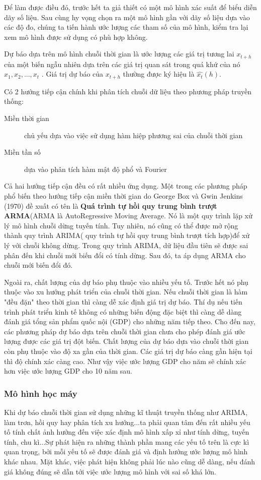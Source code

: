 Để làm được điều đó, trước hết ta giả thiết có một mô hình xác suất để biểu diễn dãy số liệu. Sau cùng hy vọng chọn ra một mô hình gần với dãy số liệu dựa vào các độ đo, chúng ta tiến hành ước lượng các tham số của mô hình, kiểm tra lại xem mô hình được sử dụng có phù hợp không.

Dự báo dựa trên mô hình chuỗi thời gian là ước lượng các giá trị tương lai $x_{t+h}$ của một biến ngẫu nhiên dựa trên các giá trị quan sát trong quá khứ của nó $x_1,x_2,...,x_t$ . Giá trị dự báo của $x_{t+h}$ thường được ký hiệu là $\hat{x_t}(h)$.


Có 2 hướng tiếp cận chính \citep{cits} khi phân tích chuỗi dữ liệu theo phương pháp truyền thống:
\begin{description}
  \item[Miền thời gian] chủ yếu dựa vào việc sử dụng hàm hiệp phương sai của chuỗi thời gian
  \item[Miền tần số] dựa vào phân tích hàm mật độ phổ và Fourier
\end{description}
Cả hai hướng tiếp cận đều có rất nhiều ứng dụng. Một trong các phương pháp phổ biến theo hướng tiếp cận miền thời gian do George Box và Gwin Jenkins (1970)\citep{ross} đề xuất có tên là \textbf{Quá trình tự hồi quy trung bình trượt ARMA}(ARMA là AutoRegressive Moving Average. Nó là một quy trình lặp xử lý mô hình chuỗi dừng tuyến tính. Tuy nhiên, nó cũng có thể được mở rộng thành quy trình ARIMA( quy trình tự hồi quy trung bình trượt tích hợp)để xử lý với chuỗi không dừng. Trong quy trình ARIMA, dữ liệu đầu tiên sẽ được sai phân đến khi chuỗi mới biến đổi có tính dừng. Sau đó, ta áp dụng ARMA cho chuỗi mới biến đổi đó.

Ngoài ra, chất lượng của dự báo phụ thuộc vào nhiều yếu tố. Trước hết nó phụ thuộc vào xu hướng phát triển của chuỗi thời gian. Nếu chuỗi thời gian là hàm "đều đặn" theo thời gian thì càng dễ xác định giá trị dự báo. Thí dụ nếu tiến trình phát triển kinh tế không có những biến động đặc biệt thì càng dễ dàng đánh giá tổng sản phẩm quốc nội (GDP) cho những năm tiếp theo. Cho đến nay, các phương pháp dự báo dựa trên chuỗi thời gian chưa cho phép đánh giá ước lượng được các giá trị đột biến. Chất lượng của dự báo dựa vào chuỗi thời gian còn phụ thuộc vào độ xa gần của thời gian. Các giá trị dự báo càng gần hiện tại thì độ chính xác càng cao. Như vậy việc ước lượng GDP cho năm sẽ chính xác hơn việc ước lượng GDP cho 10 năm sau.
\subsubsection{Mô hình học máy}
Khi dự báo chuỗi thời gian sử dụng những kĩ thuật truyền thống như ARIMA, làm trơn, hồi quy hay phân tích xu hướng...ta phải quan tâm đến rất nhiều yếu tố tính chất ảnh hưởng đến việc xác định mô hình xấp xỉ như tính dừng, tuyến tính, chu kì...Sự phát hiện ra những thành phần mang các yếu tố trên là cực kì quan trọng, bởi mỗi yếu tố sẽ được đánh giá và định hướng ước lượng mô hình khác nhau. Mặt khác, việc phát hiện không phải lúc nào cũng dễ dàng, nếu đánh giá không đúng sẽ dẫn tới việc ước lượng mô hình với sai số khá lớn. 

